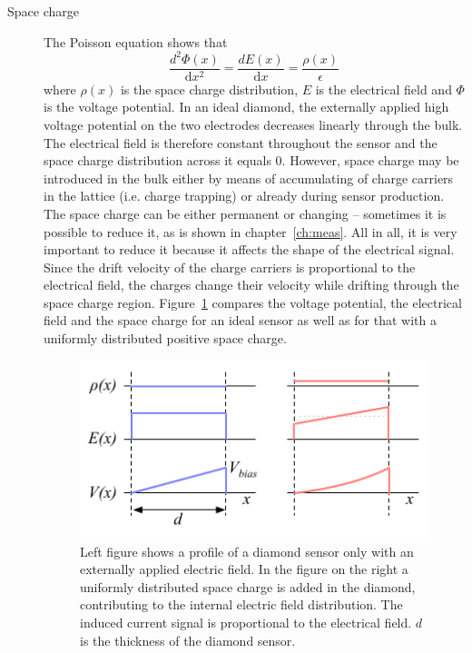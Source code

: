 \begin{description}
\item[Space charge] 
The Poisson equation shows that 
\begin{equation}
\label{eq:poisson}
\frac{d^2\Phi(x)}{\mathrm{d}x^2} = \frac{dE(x)}{\mathrm{d}x} = \frac{\rho(x)}{\epsilon}
\end{equation}
where $\rho(x)$ is the space charge distribution, $E$ is the electrical field and $\Phi$ is the voltage potential. In an ideal diamond, the externally applied high voltage potential on the two electrodes decreases linearly through the bulk. The electrical field is therefore constant throughout the sensor and the space charge distribution across it equals 0. However, space charge may be introduced in the bulk either by means of accumulating of charge carriers in the lattice (i.e. charge trapping) or already during sensor production. The space charge can be either permanent or changing -- sometimes it is possible to reduce it, as is shown in chapter~\ref{ch:meas}. All in all, it is very important to reduce it because it affects the shape of the electrical signal. Since the drift velocity of the charge carriers is proportional to the electrical field, the charges change their velocity while drifting through the space charge region. Figure~\ref{fig:spcchg} compares the voltage potential, the electrical field and the space charge for an ideal sensor as well as for that with a uniformly distributed positive space charge.
\begin{figure}[!t]
\begin{center}
\includegraphics[width=0.6\linewidth]{02_pulse_formation/pics/plots/spcchg}
\caption{Left figure shows a profile of a diamond sensor only with an externally applied electric field. In the figure on the right a uniformly distributed space charge is added in the diamond, contributing to  the internal electric field distribution. The induced current signal is proportional to the electrical field. $d$ is the thickness of the diamond sensor.}
\label{fig:spcchg}
\end{center}
\end{figure}



\end{description}
